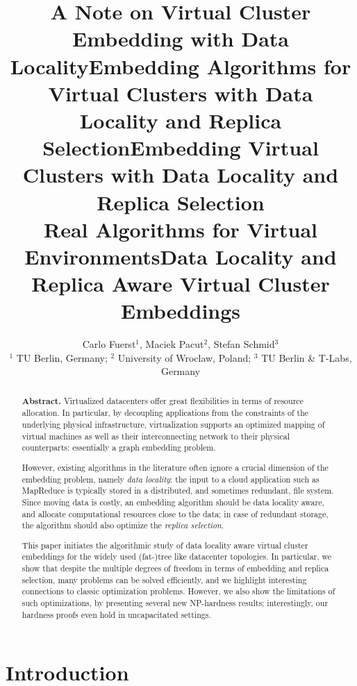 \documentclass[9pt,twocolumn]{scrartcl}
\title{A Note on Virtual Cluster Embedding with Data Locality}
\title{Embedding Algorithms for Virtual Clusters with Data Locality and Replica Selection}
\title{Embedding Virtual Clusters with Data Locality and Replica Selection\\{\Large Real Algorithms for Virtual Environments}}
\title{Data Locality and Replica Aware Virtual Cluster Embeddings}
\author{Carlo Fuerst$^1$, Maciek Pacut$^2$, Stefan Schmid$^3$\\
{\small $^1$ TU Berlin, Germany; $^2$ University of Wroclaw, Poland; $^3$ TU Berlin \& T-Labs, Germany}}
\begin{document}
\maketitle


\begin{abstract}
\textbf{Abstract.} Virtualized datacenters offer great flexibilities in terms of resource allocation. In particular, by
decoupling applications from the constraints of the underlying physical infrastructure, virtualization
supports an optimized mapping of virtual machines as well as their interconnecting network
to their
physical counterparts: essentially a graph embedding problem.

However, existing algorithms
in the literature often ignore a crucial dimension of the embedding problem, namely \emph{data locality}:
the input to a cloud application such as MapReduce is typically stored in a distributed,
and sometimes redundant, file system. Since moving 
data is costly, an embedding algorithm should be data locality aware,
and allocate computational resources close to the data; in case of redundant storage, the algorithm should also optimize the \emph{replica selection}.

This paper initiates the algorithmic study of data locality aware virtual cluster embeddings for
the widely used (fat-)tree like datacenter topologies.
In particular, we
show that
despite the multiple degrees of freedom in terms of embedding and replica selection,
many problems can be
solved efficiently, and we highlight interesting connections
to classic optimization problems. However, we also show the limitations of such optimizations,
by presenting several new NP-hardness results; interestingly,
our hardness proofs even hold in uncapacitated settings.
\end{abstract}

\section{Introduction}

\end{document}
